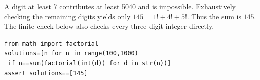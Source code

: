 A digit at least 7 contributes at least 5040 and is impossible. Exhaustively checking the remaining digits yields only $145=1!+4!+5!$. Thus the sum is $\boxed{145}$. The finite check below also checks every three-digit integer directly.
\begin{verbatim}
from math import factorial
solutions=[n for n in range(100,1000)
 if n==sum(factorial(int(d)) for d in str(n))]
assert solutions==[145]
\end{verbatim}

